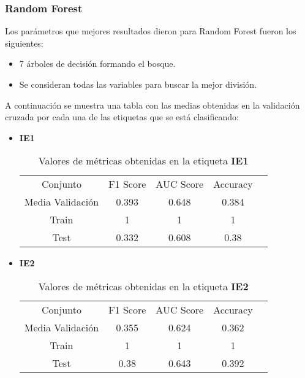 \subsubsection*{Random Forest}
Los parámetros que mejores resultados dieron para Random Forest fueron los siguientes:
\begin{itemize}
	\item 7 árboles de decisión formando el bosque.
	\item Se consideran todas las variables para buscar la mejor división.
\end{itemize}
A continuación se muestra una tabla con las medias obtenidas en la validación cruzada por cada una de las etiquetas que se está clasificando:
\begin{itemize}
	\item \textbf{IE1}
	      \begin{table}[H]
		      \centering
		      \begin{tabular}{|c|c|c|c|c}
			      \cline{1-4}
			      Conjunto         & F1 Score & AUC Score & Accuracy \\ \cline{1-4}
			      Media Validación & 0.393    & 0.648     & 0.384    \\ \cline{1-4}
			      Train            & 1        & 1         & 1        \\ \cline{1-4}
			      Test             & 0.332    & 0.608     & 0.38     \\ \cline{1-4}
		      \end{tabular}
		      \caption{Valores de métricas obtenidas en la etiqueta \textbf{IE1}}
	      \end{table}
	\item  \textbf{IE2}
	      \begin{table}[H]
		      \centering
		      \begin{tabular}{|c|c|c|c|c}
			      \cline{1-4}
			      Conjunto         & F1 Score & AUC Score & Accuracy \\ \cline{1-4}
			      Media Validación & 0.355    & 0.624     & 0.362    \\ \cline{1-4}
			      Train            & 1        & 1         & 1        \\ \cline{1-4}
			      Test             & 0.38     & 0.643     & 0.392    \\ \cline{1-4}
		      \end{tabular}
		      \caption{Valores de métricas obtenidas en la etiqueta \textbf{IE2}}
	      \end{table}


\end{itemize}
